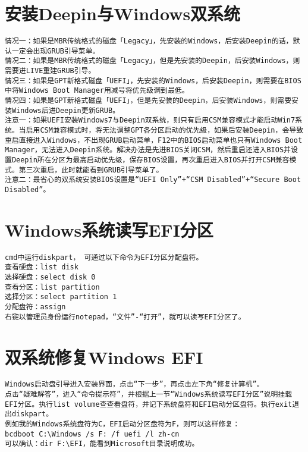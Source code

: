 \documentclass[a4paper,fontset=fandol,zihao=-4,linespread=1.2]{ctexbook}
\begin{document}
\section{安装Deepin与Windows双系统}
\begin{lstlisting}
情况一：如果是MBR传统格式的磁盘「Legacy」，先安装的Windows，后安装Deepin的话，默认一定会出现GRUB引导菜单。
情况二：如果是MBR传统格式的磁盘「Legacy」，但是先安装的Deepin，后安装Windows，则需要进LIVE重建GRUB引导。
情况三：如果是GPT新格式磁盘「UEFI」，先安装的Windows，后安装Deepin，则需要在BIOS中将Windows Boot Manager用减号将优先级调到最低。
情况四：如果是GPT新格式磁盘「UEFI」，但是先安装的Deepin，后安装Windows，则需要安装Windows后进Deepin更新GRUB。
注意一：如果UEFI安装Windows7与Deepin双系统，则只有启用CSM兼容模式才能启动Win7系统。当启用CSM兼容模式时，将无法调整GPT各分区启动的优先级，如果后安装Deepin，会导致重启直接进入Windows，不出现GRUB启动菜单，F12中的BIOS启动菜单也只有Windows Boot Manager，无法进入Deepin系统。解决办法是先进BIOS关闭CSM，然后重启还进入BIOS并设置Deepin所在分区为最高启动优先级，保存BIOS设置，再次重启进入BIOS并打开CSM兼容模式。第三次重启，此时就能看到GRUB引导菜单了。
注意二：最省心的双系统安装BIOS设置是“UEFI Only”+“CSM Disabled”+“Secure Boot Disabled”。
\end{lstlisting}

\section{Windows系统读写EFI分区}
\begin{lstlisting}
cmd中运行diskpart， 可通过以下命令为EFI分区分配盘符。
查看硬盘：list disk
选择硬盘：select disk 0
查看分区：list partition
选择分区：select partition 1
分配盘符：assign
右键以管理员身份运行notepad，“文件”-“打开”，就可以读写EFI分区了。
\end{lstlisting}

\section{双系统修复Windows EFI}
\begin{lstlisting}
Windows启动盘引导进入安装界面，点击“下一步”，再点击左下角“修复计算机”。
点击“疑难解答”，进入“命令提示符”，并根据上一节“Windows系统读写EFI分区”说明挂载EFI分区。执行list volume查查看盘符，并记下系统盘符和EFI启动分区盘符。执行exit退出diskpart。
例如我的Windows系统盘符为C，EFI启动分区盘符为F，则可以这样修复：
bcdboot C:\Windows /s F: /f uefi /l zh-cn
可以确认：dir F:\EFI，能看到Microsoft目录说明成功。
\end{lstlisting}
\end{document}
